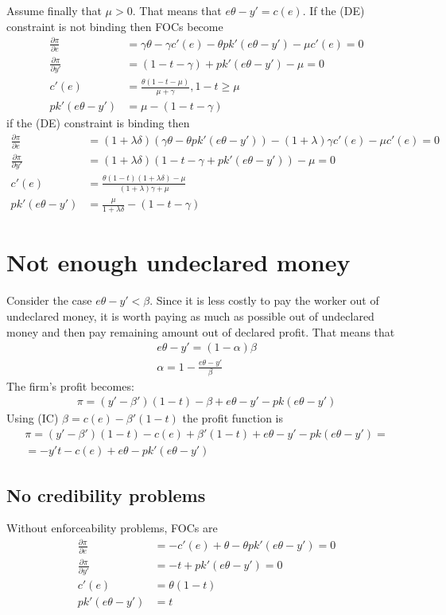 \documentclass[a4paper]{article}
\begin{document}
Assume finally that $\mu > 0$. That means that $e\theta - y' = c(e)$. If the (DE) constraint is not binding then FOCs become
\begin{align*}
\frac{\partial \pi}{\partial e} &= \gamma \theta- \gamma c'(e) - \theta p k'(e \theta - y') - \mu c'(e) = 0\\
\frac{\partial \pi}{\partial y'} &= (1 - t - \gamma)+pk'(e\theta - y') - \mu  = 0\\
c'(e) &= \frac{\theta(1 - t - \mu)}{\mu + \gamma}, 1-t \ge \mu\\
pk'(e\theta - y') &= \mu - (1 - t - \gamma)
\end{align*}
if the (DE) constraint is binding then 
\begin{align*}
\frac{\partial \pi}{\partial e} &= (1 + \lambda \delta)(\gamma \theta - \theta p k'(e \theta - y')) - (1+\lambda) \gamma c'(e) - \mu c'(e) = 0\\
\frac{\partial \pi}{\partial y'} &= (1+\lambda \delta)(1 - t - \gamma+pk'(e\theta - y')) - \mu = 0\\
c'(e) &= \frac{\theta(1-t)(1+\lambda \delta) - \mu}{(1 + \lambda)\gamma + \mu}\\
pk'(e\theta - y') &= \frac{\mu}{1+\lambda \delta} - (1 - t- \gamma)
\end{align*}
\section{Not enough undeclared money}
Consider the case $e\theta - y' < \beta$. Since it is less costly to pay the worker out of undeclared money, it is worth paying as much as possible out of undeclared money and then pay remaining amount out of declared profit. That means that 
\begin{align*}
e\theta - y' = (1 - \alpha) \beta\\
\alpha = 1 - \frac{e \theta - y'}{\beta}
\end{align*}
The firm's profit becomes:
\begin{align*}
\pi = (y' - \beta')(1 - t) - \beta + e \theta - y' - pk(e \theta - y')
\end{align*}
Using (IC) $\beta = c(e) - \beta'(1-t)$ the profit function is
\begin{align*}
\pi = (y'-\beta')(1-t) - c(e) + \beta' (1-t) +e \theta -y' -pk(e \theta - y') = \\ =-y't - c(e) + e \theta -pk'(e \theta - y')
\end{align*}
\subsection{No credibility problems}
Without enforceability problems, FOCs are
\begin{align*}
\frac{\partial \pi }{\partial e} &= -c'(e) + \theta - \theta p k'(e\theta - y') = 0\\
\frac{\partial \pi}{\partial y'} &= -t + pk'(e \theta - y') = 0\\
c'(e) &= \theta(1-t)\\
pk'(e \theta -y') &= t
\end{align*}
\end{document}
